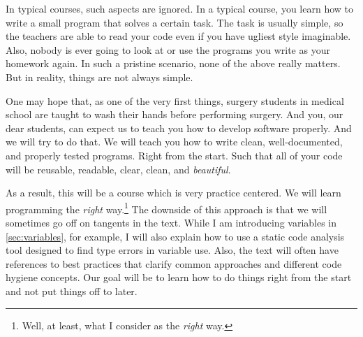In typical courses, such aspects are ignored.
In a typical course, you learn how to write a small program that solves a certain task.
The task is usually simple, so the teachers are able to read your code even if you have ugliest style imaginable.
Also, nobody is ever going to look at or use the programs you write as your homework again.
In such a pristine scenario, none of the above really matters.
But in reality, things are not always simple.

One may hope that, as one of the very first things, surgery students in medical school are taught to wash their hands before performing surgery.
And you, our dear students, can expect us to teach you how to develop software properly.
And we will try to do that.
We will teach you how to write clean, well-documented, and properly tested programs.
Right from the start.
Such that all of your code will be reusable, readable, clear, clean, and \emph{beautiful}.

As a result, this will be a course which is very practice centered.
We will learn programming the \emph{right} way.\footnote{%
Well, at least, what I consider as the \emph{right} way.%
}
The downside of this approach is that we will sometimes go off on tangents in the text.
While I am introducing variables in \cref{sec:variables}, for example, I will also explain how to use a static code analysis tool designed to find type errors in variable use.
Also, the text will often have references to best practices that clarify common approaches and different code hygiene concepts.
Our goal will be to learn how to do things right from the start and not put things off to later.%
%
\endhsection%
%
